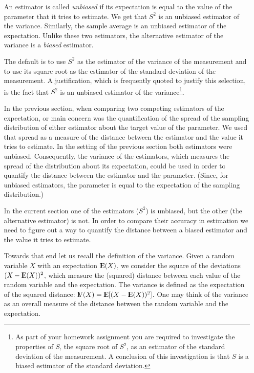 \documentclass[]{krantz}
\newcommand{\Expec}{{\rm I\kern-.3em E}}
\newcommand{\Var}{{\rm I\kern-.3em V}}
\theoremstyle{definition}
\theoremstyle{definition}
\theoremstyle{definition}
\theoremstyle{remark}
\begin{document}
An estimator is called \emph{unbiased} if its expectation is equal to the
value of the parameter that it tries to estimate. We get that \(S^2\) is
an unbiased estimator of the variance. Similarly, the sample average is
an unbiased estimator of the expectation. Unlike these two estimators,
the alternative estimator of the variance is a \emph{biased} estimator.

The default is to use \(S^2\) as the estimator of the variance of the
measurement and to use its square root as the estimator of the standard
deviation of the measurement. A justification, which is frequently
quoted to justify this selection, is the fact that \(S^2\) is an unbiased
estimator of the variance\footnote{As part of your homework assignment you are required to
  investigate the properties of \(S\), the square root of \(S^2\), as an
  estimator of the standard deviation of the measurement. A conclusion
  of this investigation is that \(S\) is a biased estimator of the
  standard deviation.}.

In the previous section, when comparing two competing estimators of the
expectation, or main concern was the quantification of the spread of the
sampling distribution of either estimator about the target value of the
parameter. We used that spread as a measure of the distance between the
estimator and the value it tries to estimate. In the setting of the
previous section both estimators were unbiased. Consequently, the
variance of the estimators, which measures the spread of the
distribution about its expectation, could be used in order to quantify
the distance between the estimator and the parameter. (Since, for
unbiased estimators, the parameter is equal to the expectation of the
sampling distribution.)

In the current section one of the estimators (\(S^2\)) is unbiased, but
the other (the alternative estimator) is not. In order to compare their
accuracy in estimation we need to figure out a way to quantify the
distance between a biased estimator and the value it tries to estimate.

Towards that end let us recall the definition of the variance. Given a
random variable \(X\) with an expectation \(\Expec(X)\), we consider the
square of the deviations \((X - \Expec(X))^2\), which measure the
(squared) distance between each value of the random variable and the
expectation. The variance is defined as the expectation of the squared
distance: \(\Var(X) = \Expec[(X-\Expec(X))^2]\). One may think of the
variance as an overall measure of the distance between the random
variable and the expectation.
\end{document}

